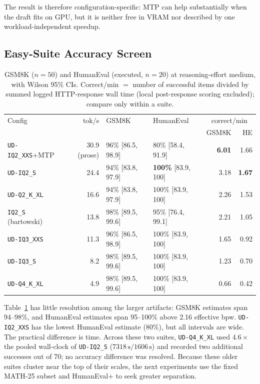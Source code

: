 \documentclass[11pt]{article}
\newcommand{\q}[1]{\texttt{#1}}
\begin{document}
The result is therefore configuration-specific: MTP can help substantially
when the draft fits on GPU, but it is neither free in VRAM nor described by one
workload-independent speedup.



\subsection{Easy-Suite Accuracy Screen}
\label{sec:phase2}
\label{sec:phase2a}

\begin{table}[t]
\centering
\small
\caption{GSM8K ($n{=}50$) and HumanEval (executed, $n{=}20$) at
reasoning-effort medium, with Wilson 95\% CIs. Correct/min $=$ number of
successful items divided by summed logged HTTP-response wall time (local
post-response scoring excluded); compare only within a suite.}
\label{tab:phase2a}
\begin{tabular}{lrllrr}
\toprule
Config & tok/s & GSM8K & HumanEval & \multicolumn{2}{c}{correct/min} \\
 & & & & GSM8K & HE \\
\midrule
\q{UD-IQ2\_XXS}+MTP & 30.9 (prose) & 96\% [86.5, 98.9] & 80\% [58.4, 91.9] & \textbf{6.01} & 1.66 \\
\q{UD-IQ2\_S} & 24.4 & 94\% [83.8, 97.9] & \textbf{100\%} [83.9, 100] & 3.18 & \textbf{1.67} \\
\q{UD-Q2\_K\_XL} & 16.6 & 94\% [83.8, 97.9] & 100\% [83.9, 100] & 2.26 & 1.53 \\
\q{IQ2\_S} (bartowski) & 13.8 & 98\% [89.5, 99.6] & 95\% [76.4, 99.1] & 2.21 & 1.05 \\
\q{UD-IQ3\_XXS} & 11.3 & 96\% [86.5, 98.9] & 100\% [83.9, 100] & 1.65 & 0.92 \\
\q{UD-IQ3\_S} & 8.2 & 98\% [89.5, 99.6] & 100\% [83.9, 100] & 1.23 & 0.70 \\
\q{UD-Q4\_K\_XL} & 4.9 & 98\% [89.5, 99.6] & 100\% [83.9, 100] & 0.66 & 0.42 \\
\bottomrule
\end{tabular}
\end{table}

Table~\ref{tab:phase2a} has little resolution among the larger artifacts:
GSM8K estimates span 94--98\%, and HumanEval estimates span 95--100\% above
2.16 effective bpw. \q{UD-IQ2\_XXS} has the lowest HumanEval estimate (80\%),
but all intervals are wide. The practical difference is time. Across these two
suites, \q{UD-Q4\_K\_XL} used $4.6\times$ the pooled wall-clock of
\q{UD-IQ2\_S} ($7318\,\text{s}/1606\,\text{s}$) and recorded two additional
successes out of 70; no accuracy difference was resolved. Because these older
suites cluster near the top of their scales, the next experiments use the fixed MATH-25
subset and HumanEval+ to seek greater separation.
\end{document}
